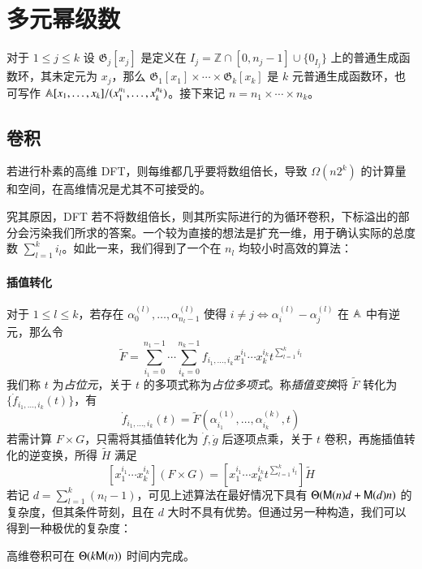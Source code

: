 
\section{多元幂级数}

\begin{definition}
对于 $1\le j\le k$ 设 $\mathfrak G_j[x_j]$ 是定义在 $I_j = \mathbb Z\cap[0,n_j-1] \cup \{0_{I_j}\}$ 上的普通生成函数环，其未定元为 $x_j$，那么 $\mathfrak G_1[x_1]\times \cdots \times \mathfrak G_k[x_k]$ 是 $k$ 元普通生成函数环，也可写作 $\mathbb A[x_1,\dots,x_k]/(x_1^{n_1},\dots,x_k^{n_k})$。接下来记 $n = n_1 \times \cdots \times n_k$。
\end{definition}

\subsection{卷积}

若进行朴素的高维 DFT，则每维都几乎要将数组倍长，导致 $\Omega(n2^k)$ 的计算量和空间，在高维情况是尤其不可接受的。

究其原因，DFT 若不将数组倍长，则其所实际进行的为循环卷积，下标溢出的部分会污染我们所求的答案。一个较为直接的想法是扩充一维，用于确认实际的总度数 $\sum_{l=1}^k i_l$。如此一来，我们得到了一个在 $n_l$ 均较小时高效的算法：

\paragraph{插值转化}
对于 $1\le l\le k$，若存在 $\alpha^{(l)}_0,\dots,\alpha^{(l)}_{n_l-1}$ 使得 $i\neq j \Leftrightarrow \alpha^{(l)}_i - \alpha^{(l)}_j$ 在 $\mathbb A$ 中有逆元，那么令 
$$
\tilde F = \sum_{i_1=0}^{n_1-1} \cdots \sum_{i_k=0}^{n_k-1} f_{i_1,\dots,i_k} x_1^{i_1}\cdots x_k^{i_k} t^{\sum_{l=1}^k i_l}
$$
我们称 $t$ 为\emph{占位元}，关于 $t$ 的多项式称为\emph{占位多项式}。称\emph{插值变换}将 $\tilde F$ 转化为 $\{\dot f_{i_1,\dots,i_k}(t)\}$，有
$$
\dot f_{i_1,\dots,i_k}(t) = \tilde F(\alpha^{(1)}_{i_1},\dots,\alpha^{(k)}_{i_k},t)
$$
若需计算 $F\times G$，只需将其插值转化为 $\dot f, \dot g$ 后逐项点乘，关于 $t$ 卷积，再施插值转化的逆变换，所得 $\tilde H$ 满足
$$
[x_1^{i_1}\cdots x_k^{i_k}] (F\times G) = \left[x_1^{i_1}\cdots x_k^{i_k}t^{\sum_{l=1}^k i_l}\right] \tilde H
$$
若记 $d = \sum_{l=1}^k (n_l-1)$，可见上述算法在最好情况下具有 $\Theta(\mathsf M(n)d + \mathsf M(d)n)$ 的复杂度，但其条件苛刻，且在 $d$ 大时不具有优势。但通过另一种构造，我们可以得到一种极优的复杂度：

\begin{theorem}
高维卷积可在 $\Theta(k\mathsf M(n))$ 时间内完成。
\end{theorem}

